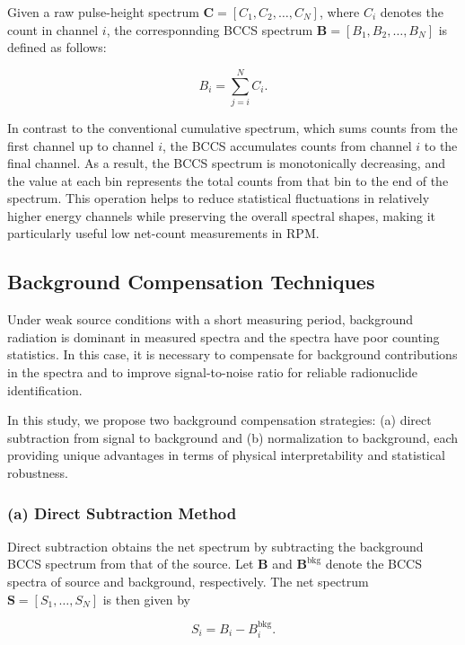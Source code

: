 \documentclass[10pt]{wlscirep}
\begin{document}
Given a raw pulse-height spectrum $\mathbf{C} = [C_1, C_2, \ldots, C_N]$, where $C_i$ denotes the count in channel $i$, the corresponnding BCCS spectrum $\mathbf{B} = [B_1, B_2, \ldots , B_N]$ is defined as follows: 

\begin{equation}
B_i = \sum_{j=i}^N C_i.
\end{equation}

In contrast to the conventional cumulative spectrum, which sums counts from the first channel up to channel $i$, the BCCS accumulates counts from channel $i$ to the final channel. As a result, the BCCS spectrum is monotonically decreasing, and the value at each bin represents the total counts from that bin to the end of the spectrum. This operation helps to reduce statistical fluctuations in relatively higher energy channels while preserving the overall spectral shapes, making it particularly useful low net-count measurements in RPM. 

\subsection*{Background Compensation Techniques}

Under weak source conditions with a short measuring period, background radiation is dominant in measured spectra and the spectra have poor counting statistics. In this case, it is necessary to compensate for background contributions in the spectra and to improve signal-to-noise ratio for reliable radionuclide identification. 

In this study, we propose two background compensation strategies: (a) direct subtraction from signal to background and (b) normalization to background, each providing unique advantages in terms of physical interpretability and statistical robustness.  

\subsubsection*{(a) Direct Subtraction Method}

Direct subtraction obtains the net spectrum by subtracting the background BCCS spectrum from that of the source. Let $\mathbf{B}$ and $\mathbf{B}^\textrm{bkg}$ denote the BCCS spectra of source and background, respectively. The net spectrum $\mathbf{S} = [S_1,\ldots,S_N]$ is then given by

\begin{equation}
S_i =  B_i - B_i^{\textrm{bkg}}.
\end{equation}
\end{document}
